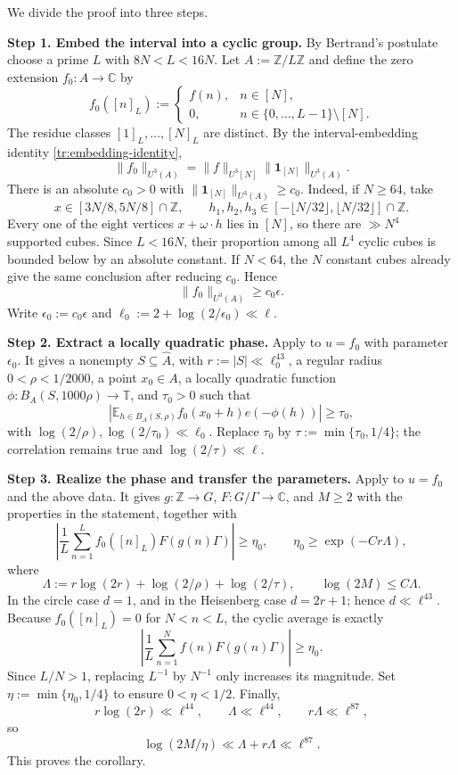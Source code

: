 \documentclass[twoside]{aomart}
\makeatletter
\theoremstyle{paperplain}
\theoremstyle{paperdefinition}
\renewenvironment{proof}[1][\proofname]{\par\pushQED{\qed}%
  \normalfont\topsep6\p@\@plus3\p@\relax\trivlist
  \item[\hskip\labelsep\itshape #1\@addpunct{.}]\ignorespaces
}{\popQED\endtrivlist\@endpefalse}
\numberwithin{equation}{section}
\makeatother
\begin{document}
\begin{proof}
We divide the proof into three steps.

\medskip
\noindent\textbf{Step 1. Embed the interval into a cyclic group.}
By Bertrand's postulate choose a prime $L$ with $8N<L<16N$.  Let
$A:=\mathbb Z/L\mathbb Z$ and define the zero extension $f_0:A\to\mathbb C$ by
\[
 f_0([n]_L):=
 \begin{cases}
 f(n),&n\in[N],\\
 0,&n\in\{0,\ldots,L-1\}\setminus[N].
 \end{cases}
\]
The residue classes $[1]_L,\ldots,[N]_L$ are distinct.  By the
interval-embedding identity \eqref{tr:embedding-identity},
\[
 \|f_0\|_{U^3(A)}
 =\|f\|_{U^3[N]}
  \|\mathbf1_{[N]}\|_{U^3(A)}.
\]
There is an absolute $c_0>0$ with
$\|\mathbf1_{[N]}\|_{U^3(A)}\ge c_0$.  Indeed, if $N\ge64$, take
\[
 x\in[3N/8,5N/8]\cap\mathbb Z,
 \qquad h_1,h_2,h_3\in[-\lfloor N/32\rfloor,\lfloor N/32\rfloor]\cap\mathbb Z.
\]
Every one of the eight vertices $x+\omega\cdot h$ lies in $[N]$, so there
are $\gg N^4$ supported cubes.  Since $L<16N$, their proportion among
all $L^4$ cyclic cubes is bounded below by an absolute constant.  If
$N<64$, the $N$ constant cubes already give the same conclusion after
reducing $c_0$.  Hence
\[
 \|f_0\|_{U^3(A)}\ge c_0\epsilon.
\]
Write $\epsilon_0:=c_0\epsilon$ and
$\ell_0:=2+\log(2/\epsilon_0)\ll\ell$.

\medskip
\noindent\textbf{Step 2. Extract a locally quadratic phase.}
Apply  to $u=f_0$ with parameter $\epsilon_0$.
It gives a nonempty $S\subseteq\widehat A$, with
$r:=|S|\ll\ell_0^{43}$, a regular radius $0<\rho<1/2000$, a point
$x_0\in A$, a locally quadratic function
$\phi:B_A(S,1000\rho)\to\mathbb T$, and $\tau_0>0$ such that
\[
 \left|\mathbb E_{h\in B_A(S,\rho)}
 f_0(x_0+h)e(-\phi(h))\right|\ge\tau_0,
\]
with $\log(2/\rho),\log(2/\tau_0)\ll\ell_0$.  Replace
$\tau_0$ by $\tau:=\min\{\tau_0,1/4\}$; the correlation remains true and
$\log(2/\tau)\ll\ell$.

\medskip
\noindent\textbf{Step 3. Realize the phase and transfer the parameters.}
Apply  to $u=f_0$ and the above data.  It gives
$g:\mathbb Z\to G$, $F:G/\Gamma\to\mathbb C$, and $M\ge2$ with the
properties in the statement, together with
\[
 \left|\frac1L\sum_{n=1}^L
 f_0([n]_L)F(g(n)\Gamma)\right|\ge\eta_0,
 \qquad \eta_0\ge\exp(-Cr\Lambda),
\]
where
\[
 \Lambda:=r\log(2r)+\log(2/\rho)+\log(2/\tau),
 \qquad \log(2M)\le C\Lambda.
\]
In the circle case $d=1$, and in the Heisenberg case $d=2r+1$; hence
$d\ll\ell^{43}$.  Because $f_0([n]_L)=0$ for $N<n<L$, the cyclic average is
exactly
\[
 \left|\frac1L\sum_{n=1}^N f(n)F(g(n)\Gamma)\right|\ge\eta_0.
\]
Since $L/N>1$, replacing $L^{-1}$ by $N^{-1}$ only increases its magnitude.
Set $\eta:=\min\{\eta_0,1/4\}$ to ensure $0<\eta<1/2$.
Finally,
\[
 r\log(2r)\ll\ell^{44},\qquad \Lambda\ll\ell^{44},
 \qquad r\Lambda\ll\ell^{87},
\]
so
\[
 \log(2M/\eta)\ll\Lambda+r\Lambda\ll\ell^{87}.
\]
This proves the corollary.
\end{proof}
\end{document}
